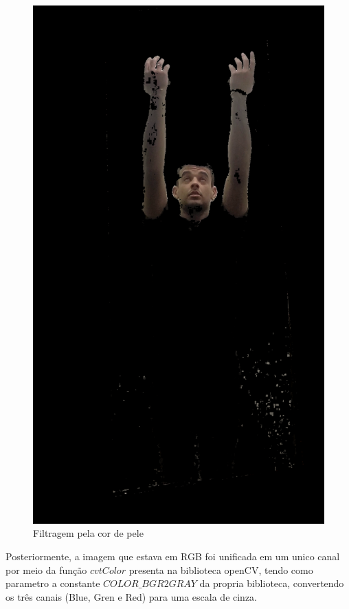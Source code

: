 \begin{figure}[!htbp]
\begin{minipage}{\sizeImg\textwidth}
        \end{minipage}
        \begin{minipage}{\sizeImg\textwidth}
            \includegraphics[width=\textwidth]{figuras/mao_barra/skin.png}
        \end{minipage}
    \caption{Filtragem pela cor de pele}
    \label{fig:skin}
\end{figure}
\newpage

Posteriormente, a imagem que estava em \ac{RGB} foi unificada em um unico canal por meio da função $cvtColor$ presenta na biblioteca \ac{openCV}, tendo como parametro a constante $COLOR\_BGR2GRAY$ da propria biblioteca, convertendo os três canais (Blue, Gren e Red) para uma escala de cinza.

